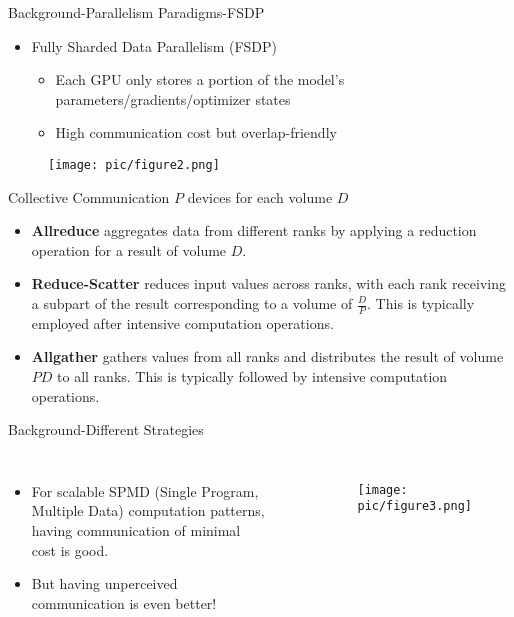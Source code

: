 \documentclass{beamer}
\begin{document}
\begin{frame}{Background-Parallelism Paradigms-FSDP}
    
    \begin{itemize}
        \item Fully Sharded Data Parallelism (FSDP)
        \begin{itemize}
            \item Each GPU only stores a portion of the model's parameters/gradients/optimizer states
            \item High communication cost but overlap-friendly
        \end{itemize}
    \end{itemize}
    \begin{figure}[h]
        \centering
        \texttt{[image: pic/figure2.png]}
    \end{figure}
\end{frame}

\begin{frame}{Collective Communication}
$P$ devices for
each volume $D$
    \begin{itemize}
        \item \textbf{Allreduce} aggregates data from different ranks by applying a reduction operation for a result of volume $D$.
        \item \textbf{Reduce-Scatter} reduces input values across ranks, with each rank receiving a subpart of the result corresponding to a volume of $\frac{D}{P}$. This is typically employed after intensive computation operations.
        \item \textbf{Allgather} gathers values from all ranks and distributes the result of volume $PD$ to all ranks. This is typically
followed by intensive computation operations.
    \end{itemize}
\end{frame}



\begin{frame}{Background-Different Strategies}
    
\begin{columns}
	\begin{itemize}
		\item {For scalable SPMD (Single Program, Multiple Data) computation patterns, having communication of minimal cost is good.      
		}
		\item {But having unperceived communication is even better!
		}
	\end{itemize}\
	\begin{figure}
		\centering
		\texttt{[image: pic/figure3.png]}
		\label{secert_sharing_figures}
	\end{figure}
\end{columns}
\end{frame}
\end{document}
